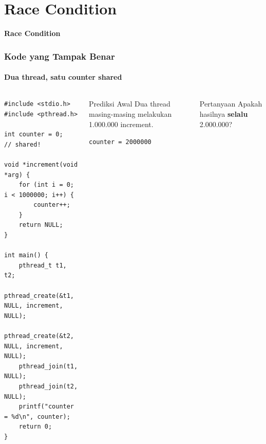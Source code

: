 \documentclass[t,aspectratio=169,xcolor=dvipsnames]{beamer}
\begin{document}
\section{Race Condition}

\begin{frame}[plain]
    \begin{center}
        \vspace{3cm}
        \Huge\textbf{Race Condition}
    \end{center}
\end{frame}

\begin{frame}[fragile]
    \frametitle{Kode yang Tampak Benar}
    \framesubtitle{Dua thread, satu counter shared}
    \scriptsize

    \begin{columns}[T]
        \begin{lstlisting}[basicstyle=\ttfamily\scriptsize, breaklines=true]
#include <stdio.h>
#include <pthread.h>

int counter = 0;   // shared!

void *increment(void *arg) {
    for (int i = 0; i < 1000000; i++) {
        counter++;
    }
    return NULL;
}

int main() {
    pthread_t t1, t2;
    pthread_create(&t1, NULL, increment, NULL);
    pthread_create(&t2, NULL, increment, NULL);
    pthread_join(t1, NULL);
    pthread_join(t2, NULL);
    printf("counter = %d\n", counter);
    return 0;
}
        \end{lstlisting}

        \begin{block}{Prediksi Awal}
            \small Dua thread masing-masing melakukan 1.000.000 increment.

            \vspace{0.15cm}
            \centering
            \Large\texttt{counter = 2000000}
        \end{block}

        \vspace{0.2cm}
        \begin{alertblock}{Pertanyaan}
            Apakah hasilnya \textbf{selalu} 2.000.000?
        \end{alertblock}
    \end{columns}
\end{frame}
\end{document}

